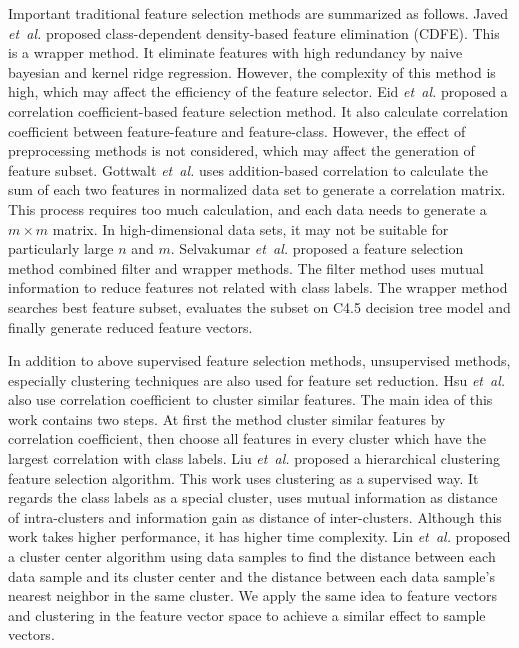 \documentclass{ieeeaccess}
\theoremstyle{definition}
\begin{document}
Important traditional feature selection methods are summarized as follows. 
Javed \emph{et~al.} \cite{Javed2012} proposed class-dependent density-based feature elimination (CDFE). This is a wrapper method. It eliminate features with high redundancy by naive bayesian and kernel ridge regression. However, the complexity of this method is high, which may affect the efficiency of the feature selector.
Eid \emph{et~al.} \cite{Eid2013} proposed a correlation coefficient-based feature selection method. It also calculate correlation coefficient between feature-feature and feature-class. However, the effect of preprocessing methods is not considered, which may affect the generation of feature subset. 
Gottwalt \emph{et~al.} \cite{CorrCorr2019} uses addition-based correlation to calculate the sum of each two features in normalized data set to generate a correlation matrix. This process requires too much calculation, and each data needs to generate a $m \times m$ matrix. In high-dimensional data sets, it may not be suitable for particularly large $n$ and $m$.
Selvakumar \emph{et~al.} \cite{Selvakumar2019} proposed a feature selection method combined filter and wrapper methods. The filter method uses mutual information to reduce features not related with class labels. The wrapper method searches best feature subset, evaluates the subset on C4.5 decision tree model and finally generate reduced feature vectors. 

In addition to above supervised feature selection methods, unsupervised methods, especially clustering techniques are also used for feature set reduction.
Hsu \emph{et~al.} \cite{Hsu2010} also use correlation coefficient to cluster similar features. The main idea of this work contains two steps. At first the method cluster similar features by correlation coefficient, then choose all features in every cluster which have the largest correlation with class labels. 
Liu \emph{et~al.} \cite{Liu2011} proposed a hierarchical clustering feature selection algorithm. This work uses clustering as a supervised way. It regards the class labels as a special cluster, uses mutual information as distance of intra-clusters and information gain as distance of inter-clusters. Although this work takes higher performance, it has higher time complexity. 
Lin \emph{et~al.} \cite {CANN2015} proposed a cluster center algorithm using data samples to find the distance between each data sample and its cluster center and the distance between each data sample's nearest neighbor in the same cluster. We apply the same idea to feature vectors and clustering in the feature vector space to achieve a similar effect to sample vectors.
\end{document}

